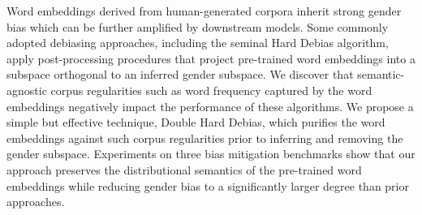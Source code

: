 Word embeddings derived from human-generated corpora inherit strong gender bias which can be further amplified by downstream models. Some commonly adopted debiasing approaches, including the seminal Hard Debias algorithm, apply post-processing procedures that project pre-trained word embeddings into a subspace orthogonal to an inferred gender subspace. We discover that semantic-agnostic corpus regularities such as word frequency captured by the word embeddings negatively impact the performance of these algorithms. We propose a simple but effective technique, Double Hard Debias, which purifies the word embeddings against such corpus regularities prior to inferring and removing the gender subspace. Experiments on three bias mitigation benchmarks show that our approach preserves the distributional semantics of the pre-trained word embeddings while reducing gender bias to a significantly larger degree than prior approaches.
